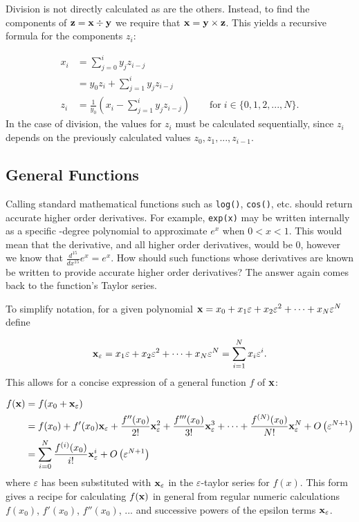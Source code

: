 \documentclass{article}
\begin{document}
Division is not directly calculated as are the others. Instead, to find the components of
${\bf z}={\bf x}\div{\bf y}$ we require that ${\bf x}={\bf y}\times{\bf z}$. This yields
a recursive formula for the components $z_i$:

\begin{align*}
x_i &= \sum_{j=0}^iy_jz_{i-j} \\
 &= y_0z_i + \sum_{j=1}^iy_jz_{i-j} \\
z_i &= \frac{1}{y_0}\left(x_i - \sum_{j=1}^iy_jz_{i-j}\right) \qquad \text{for}\; i\in\{0,1,2,...,N\}.
\end{align*}
In the case of division, the values for $z_i$ must be calculated sequentially, since $z_i$
depends on the previously calculated values $z_0, z_1, ..., z_{i-1}$.

\subsection{General Functions}

Calling standard mathematical functions such as {\tt log()}, {\tt cos()}, etc. should return accurate higher
order derivatives. For example, {\tt exp(x)} may be written internally as a specific -degree polynomial to
approximate $e^x$ when $0<x<1$. This would mean that the  derivative, and all higher order derivatives, would
be 0, however we know that $\frac{d^{15}}{dx^{15}}e^x=e^x$.  How should such functions whose derivatives are known
be written to provide accurate higher order derivatives? The answer again comes back to the function's Taylor series.

To simplify notation, for a given polynomial ${\bf x} = x_0 + x_1\varepsilon + x_2\varepsilon^2 +\cdots+
x_N\varepsilon^N$ define

\[
{\bf x}_\varepsilon = x_1\varepsilon + x_2\varepsilon^2 +\cdots+ x_N\varepsilon^N = \sum_{i=1}^Nx_i\varepsilon^i.
\]
This allows for a concise expression of a general function $f$ of $\bf x$:

\begin{align*}
f({\bf x}) &= f(x_0 + {\bf x}_\varepsilon) \\
 & = f(x_0) + f'(x_0){\bf x}_\varepsilon + \frac{f''(x_0)}{2!}{\bf x}_\varepsilon^2 + \frac{f'''(x_0)}{3!}{\bf x}_\varepsilon^3 + \cdots + \frac{f^{(N)}(x_0)}{N!}{\bf x}_\varepsilon^N + O\left(\varepsilon^{N+1}\right) \\
 & = \sum_{i=0}^N\frac{f^{(i)}(x_0)}{i!}{\bf x}_\varepsilon^i + O\left(\varepsilon^{N+1}\right)
\end{align*}
where $\varepsilon$ has been substituted with ${\bf x}_\varepsilon$ in the $\varepsilon$-taylor series
for $f(x)$. This form gives a recipe for calculating $f({\bf x})$ in general from regular numeric calculations
$f(x_0)$, $f'(x_0)$, $f''(x_0)$, ... and successive powers of the epsilon terms ${\bf x}_\varepsilon$.
\end{document}

